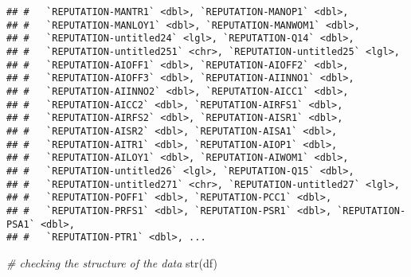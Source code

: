 \documentclass[
]{article}
\newenvironment{Shaded}{\begin{snugshade}}{\end{snugshade}}
\newcommand{\CommentTok}[1]{\textcolor[rgb]{0.56,0.35,0.01}{\textit{#1}}}
\newcommand{\FunctionTok}[1]{\textcolor[rgb]{0.00,0.00,0.00}{#1}}
\newcommand{\NormalTok}[1]{#1}
\begin{document}
\begin{verbatim}
## #   `REPUTATION-MANTR1` <dbl>, `REPUTATION-MANOP1` <dbl>,
## #   `REPUTATION-MANLOY1` <dbl>, `REPUTATION-MANWOM1` <dbl>,
## #   `REPUTATION-untitled24` <lgl>, `REPUTATION-Q14` <dbl>,
## #   `REPUTATION-untitled251` <chr>, `REPUTATION-untitled25` <lgl>,
## #   `REPUTATION-AIOFF1` <dbl>, `REPUTATION-AIOFF2` <dbl>,
## #   `REPUTATION-AIOFF3` <dbl>, `REPUTATION-AIINNO1` <dbl>,
## #   `REPUTATION-AIINNO2` <dbl>, `REPUTATION-AICC1` <dbl>,
## #   `REPUTATION-AICC2` <dbl>, `REPUTATION-AIRFS1` <dbl>,
## #   `REPUTATION-AIRFS2` <dbl>, `REPUTATION-AISR1` <dbl>,
## #   `REPUTATION-AISR2` <dbl>, `REPUTATION-AISA1` <dbl>,
## #   `REPUTATION-AITR1` <dbl>, `REPUTATION-AIOP1` <dbl>,
## #   `REPUTATION-AILOY1` <dbl>, `REPUTATION-AIWOM1` <dbl>,
## #   `REPUTATION-untitled26` <lgl>, `REPUTATION-Q15` <dbl>,
## #   `REPUTATION-untitled271` <chr>, `REPUTATION-untitled27` <lgl>,
## #   `REPUTATION-POFF1` <dbl>, `REPUTATION-PCC1` <dbl>,
## #   `REPUTATION-PRFS1` <dbl>, `REPUTATION-PSR1` <dbl>, `REPUTATION-PSA1` <dbl>,
## #   `REPUTATION-PTR1` <dbl>, ...
\end{verbatim}

\begin{Shaded}
\begin{Highlighting}[]
\CommentTok{\# checking the structure of the data}
\FunctionTok{str}\NormalTok{(df)}
\end{Highlighting}
\end{Shaded}
\end{document}

